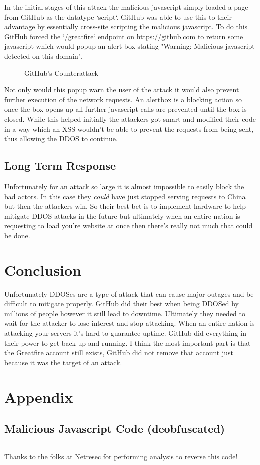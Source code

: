 \documentclass[fleqn, 12pt]{article}
\let\oldprintbib\printbibliography
\renewcommand{\printbibliography}{
    \newpage
    \oldprintbib
    \addcontentsline{toc}{section}{References}
    \newpage
}
\begin{document}
In the initial stages of this attack the malicious javascript simply loaded a page from GitHub as the datatype `script`. GitHub was able to use this to their advantage by essentially cross-site scripting the malicious javascript. To do this GitHub forced the `/greatfire` endpoint on \url{https://github.com} to return some javascript which would popup an alert box stating "Warning: Malicious javascript detected on this domain".

\begin{figure}[h]
    \begin{center}
        \caption{GitHub's Counterattack \cite{ars1}}
        \label{fig:alert}
    \end{center}
\end{figure}

Not only would this popup warn the user of the attack it would also prevent further execution of the network requests. An alertbox is a blocking action so once the box opens up all further javascript calls are prevented until the box is closed. While this helped initially the attackers got smart and modified their code in a way which an XSS wouldn't be able to prevent the requests from being sent, thus allowing the DDOS to continue.

\subsection{Long Term Response}

Unfortunately for an attack so large it is almost impossible to easily block the bad actors. In this case they \textit{could} have just stopped serving requests to China but then the attackers win. So their best bet is to implement hardware to help mitigate DDOS attacks in the future but ultimately when an entire nation is requesting to load you're website at once then there's really not much that could be done.

\section{Conclusion}

Unfortunately DDOSes are a type of attack that can cause major outages and be difficult to mitigate properly. GitHub did their best when being DDOSed by millions of people however it still lead to downtime. Ultimately they needed to wait for the attacker to lose interest and stop attacking. When an entire nation is attacking your servers it's hard to guarantee uptime. GitHub did everything in their power to get back up and running. I think the most important part is that the Greatfire account still exists, GitHub did not remove that account just because it was the target of an attack.

\printbibliography

\appendix
\section{Appendix}
\subsection{Malicious Javascript Code (deobfuscated)}
\inputminted{javascript}{code/evil.js}
\noindent Thanks to the folks at Netresec for performing analysis to reverse this code! \cite{netresec}
\end{document}
